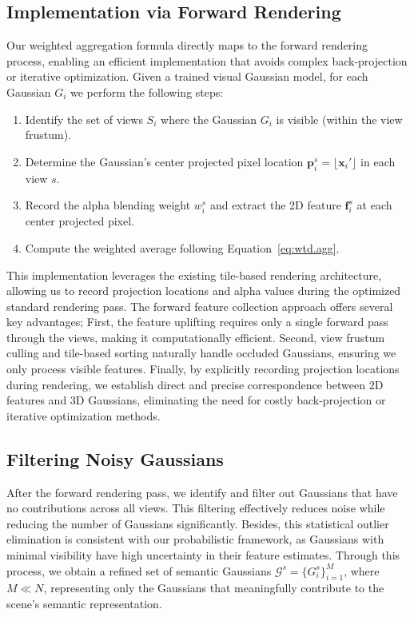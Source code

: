 \subsection{Implementation via Forward Rendering}
Our weighted aggregation formula directly maps to the forward rendering process, enabling an efficient implementation that avoids complex back-projection or iterative optimization.
Given a trained visual Gaussian model, for each Gaussian $G_i$ we perform the following steps:
\begin{enumerate}
    \item Identify the set of views $S_i$ where the Gaussian $G_i$ is visible (within the view frustum).
    \item Determine the Gaussian's center projected pixel location $\mathbf{p}_i^s = \lfloor\mathbf{x}_i'\rfloor$ in each view $s$.
    \item Record the alpha blending weight $w_i^s$ and extract the 2D feature $\mathbf{f}_i^s$ at each center projected pixel.
    \item Compute the weighted average following Equation~\ref{eq:wtd.agg}.
\end{enumerate}
This implementation leverages the existing tile-based rendering architecture, allowing us to record projection locations and alpha values during the optimized standard rendering pass. The forward feature collection approach offers several key advantages; First, the feature uplifting requires only a single forward pass through the views, making it computationally efficient. Second, view frustum culling and tile-based sorting naturally handle occluded Gaussians, ensuring we only process visible features. Finally, by explicitly recording projection locations during rendering, we establish direct and precise correspondence between 2D features and 3D Gaussians, eliminating the need for costly back-projection or iterative optimization methods.


\subsection{Filtering Noisy Gaussians}
After the forward rendering pass, we identify and filter out Gaussians that have no contributions across all views. This filtering effectively reduces noise while reducing the number of Gaussians significantly. Besides, this statistical outlier elimination is consistent with our probabilistic framework, as Gaussians with minimal visibility have high uncertainty in their feature estimates. Through this process, we obtain a refined set of semantic Gaussians $\mathcal{G}^s = \{{G_i^s}\}_{i=1}^M$, where $M \ll N$, representing only the Gaussians that meaningfully contribute to the scene's semantic representation.

